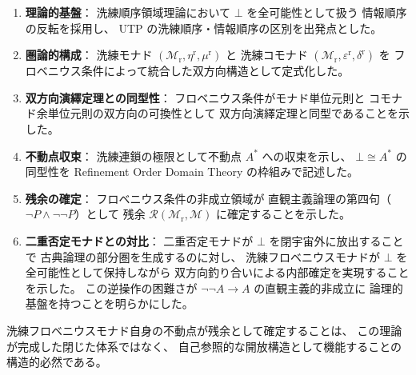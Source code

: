 \documentclass[11pt,a4paper]{article}
\theoremstyle{definition}
\newcommand{\Mr}{\mathcal{M}_{\mathrm{r}}}
\newcommand{\etar}{\eta^{\mathrm{r}}}
\newcommand{\mur}{\mu^{\mathrm{r}}}
\newcommand{\epsr}{\varepsilon^{\mathrm{r}}}
\newcommand{\deltar}{\delta^{\mathrm{r}}}
\begin{document}
\begin{enumerate}
\item \textbf{理論的基盤}：
  洗練順序領域理論において $\bot$ を全可能性として扱う
  情報順序の反転を採用し、
  UTP の洗練順序・情報順序の区別を出発点とした。

\item \textbf{圏論的構成}：
  洗練モナド $(\Mr, \etar, \mur)$ と
  洗練コモナド $(\Mr, \epsr, \deltar)$ を
  フロベニウス条件によって統合した双方向構造として定式化した。

\item \textbf{双方向演繹定理との同型性}：
  フロベニウス条件がモナド単位元則と
  コモナド余単位元則の双方向の可換性として
  双方向演繹定理と同型であることを示した。

\item \textbf{不動点収束}：
  洗練連鎖の極限として不動点 $A^*$ への収束を示し、
  $\bot \cong A^*$ の同型性を Refinement Order Domain Theory
  の枠組みで記述した。

\item \textbf{残余の確定}：
  フロベニウス条件の非成立領域が
  直観主義論理の第四句（$\neg P \wedge \neg\neg P$）として
  残余 $\mathcal{R}(\Mr, \mathcal{M})$ に確定することを示した。

\item \textbf{二重否定モナドとの対比}：
  二重否定モナドが $\bot$ を閉宇宙外に放出することで
  古典論理の部分圏を生成するのに対し、
  洗練フロベニウスモナドが $\bot$ を全可能性として保持しながら
  双方向釣り合いによる内部確定を実現することを示した。
  この逆操作の困難さが
  $\neg\neg A \to A$ の直観主義的非成立に
  論理的基盤を持つことを明らかにした。
\end{enumerate}

洗練フロベニウスモナド自身の不動点が残余として確定することは、
この理論が完成した閉じた体系ではなく、
自己参照的な開放構造として機能することの構造的必然である。
\end{document}
